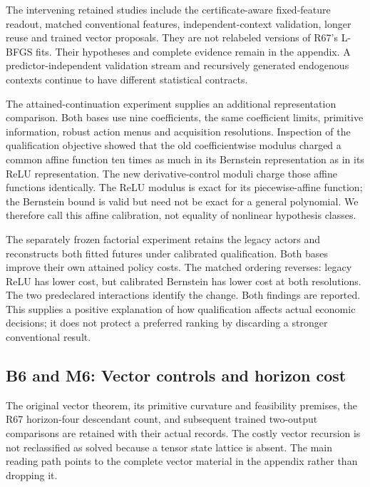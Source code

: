 \documentclass[ecta,nameyear,draft]{econsocart}
\begin{document}
The intervening retained studies include the certificate-aware
fixed-feature readout, matched conventional features,
independent-context validation, longer reuse and trained vector
proposals. They are not relabeled versions of R67's L-BFGS fits. Their
hypotheses and complete evidence remain in the appendix. A
predictor-independent validation stream and recursively generated
endogenous contexts continue to have different statistical contracts.

The attained-continuation experiment supplies an additional
representation comparison. Both bases use nine coefficients, the same
coefficient limits, primitive information, robust action menus and
acquisition resolutions. Inspection of the qualification objective
showed that the old coefficientwise modulus charged a common affine
function ten times as much in its Bernstein representation as in its
ReLU representation. The new derivative-control moduli charge those
affine functions identically. The ReLU modulus is exact for its
piecewise-affine function; the Bernstein bound is valid but need not be
exact for a general polynomial. We therefore call this affine
calibration, not equality of nonlinear hypothesis classes.

The separately frozen factorial experiment retains the legacy actors and
reconstructs both fitted futures under calibrated qualification. Both
bases improve their own attained policy costs. The matched ordering
reverses: legacy ReLU has lower cost, but calibrated Bernstein has lower
cost at both resolutions. The two predeclared interactions identify the
change. Both findings are reported. This supplies a positive explanation
of how qualification affects actual economic decisions; it does not
protect a preferred ranking by discarding a stronger conventional
result.

\hypertarget{b6-and-m6-vector-controls-and-horizon-cost}{%
\subsection{B6 and M6: Vector controls and horizon
cost}\label{b6-and-m6-vector-controls-and-horizon-cost}}

The original vector theorem, its primitive curvature and feasibility
premises, the R67 horizon-four descendant count, and subsequent trained
two-output comparisons are retained with their actual records. The
costly vector recursion is not reclassified as solved because a tensor
state lattice is absent. The main reading path points to the complete
vector material in the appendix rather than dropping it.
\end{document}
